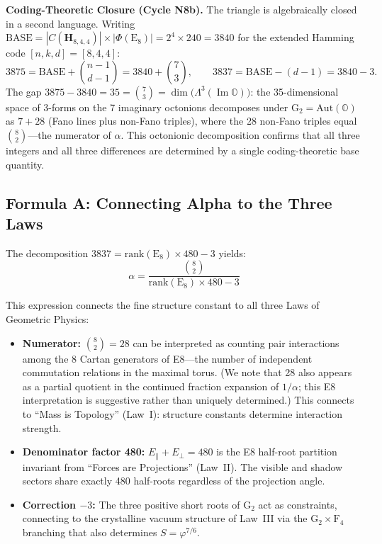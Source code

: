 \documentclass[aps,prd,twocolumn,superscriptaddress,floatfix,nofootinbib]{revtex4-2}
\theoremstyle{definition}
\theoremstyle{remark}
\newcommand{\vp}{\varphi}
\begin{document}
\textbf{Coding-Theoretic Closure (Cycle N8b).}
The triangle is algebraically closed in a second language. Writing
$\text{BASE} = |C(\mathbf{H}_{8,4,4})| \times |\Phi(\text{E}_8)| = 2^4 \times 240 = 3840$
for the extended Hamming code $[n,k,d]=[8,4,4]$:
\begin{equation}
    3875 = \text{BASE} + \binom{n-1}{d-1} = 3840 + \binom{7}{3}, \qquad
    3837 = \text{BASE} - (d-1) = 3840 - 3.
\end{equation}
The gap $3875 - 3840 = 35 = \binom{7}{3} = \dim\bigl(\Lambda^3(\operatorname{Im}\mathbb{O})\bigr)$:
the 35-dimensional space of 3-forms on the 7 imaginary octonions decomposes under
$\text{G}_2 = \mathrm{Aut}(\mathbb{O})$ as $7 + 28$ (Fano lines plus non-Fano triples),
where the 28 non-Fano triples equal $\binom{8}{2}$---the numerator of $\alpha$.
This octonionic decomposition confirms that all three integers and all three
differences are determined by a single coding-theoretic base quantity.

\subsection{Formula A: Connecting Alpha to the Three Laws}

The decomposition $3837 = \text{rank}(\text{E}_8) \times 480 - 3$ yields:
\begin{equation}
    \boxed{\alpha = \frac{\binom{8}{2}}{\text{rank}(\text{E}_8) \times 480 - 3}}
\end{equation}

This expression connects the fine structure constant to all three Laws of
Geometric Physics:

\begin{itemize}
    \item \textbf{Numerator:} $\binom{8}{2} = 28$ can be interpreted as counting
    pair interactions among the 8 Cartan generators of E8---the number of
    independent commutation relations in the maximal torus. (We note that 28 also
    appears as a partial quotient in the continued fraction expansion of $1/\alpha$;
    this E8 interpretation is suggestive rather than uniquely determined.)
    This connects to ``Mass is Topology'' (Law~I): structure constants
    determine interaction strength.

    \item \textbf{Denominator factor 480:} $E_\parallel + E_\perp = 480$ is
    the E8 half-root partition invariant from ``Forces are Projections'' (Law~II).
    The visible and shadow sectors share exactly 480 half-roots regardless of
    the projection angle.

    \item \textbf{Correction $-3$:} The three positive short roots of G$_2$
    act as constraints, connecting to the crystalline vacuum structure of
    Law~III via the $\text{G}_2 \times \text{F}_4$ branching that also
    determines $S = \vp^{7/6}$.
\end{itemize}
\end{document}

